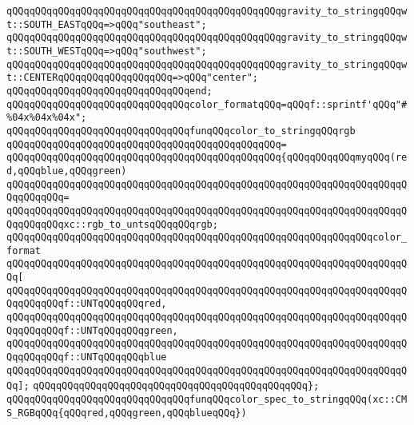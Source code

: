 \verb|qQQqqQQqqQQqqQQqqQQqqQQqqQQqqQQqqQQqqQQqqQQqqQQqgravity_to_stringqQQqwt::SOUTH_EASTqQQq=>qQQq"southeast";|\newline
\verb|qQQqqQQqqQQqqQQqqQQqqQQqqQQqqQQqqQQqqQQqqQQqqQQqgravity_to_stringqQQqwt::SOUTH_WESTqQQq=>qQQq"southwest";|\newline
\verb|qQQqqQQqqQQqqQQqqQQqqQQqqQQqqQQqqQQqqQQqqQQqqQQqgravity_to_stringqQQqwt::CENTERqQQqqQQqqQQqqQQqqQQq=>qQQq"center";|\newline
\verb|qQQqqQQqqQQqqQQqqQQqqQQqqQQqqQQqend;|\newline
\newline
\verb|qQQqqQQqqQQqqQQqqQQqqQQqqQQqqQQqcolor_formatqQQq=qQQqf::sprintf'qQQq"#%04x%04x%04x";|\newline
\newline
\verb|qQQqqQQqqQQqqQQqqQQqqQQqqQQqqQQqfunqQQqcolor_to_stringqQQqrgb|\newline
\verb|qQQqqQQqqQQqqQQqqQQqqQQqqQQqqQQqqQQqqQQqqQQqqQQq=|\newline
\verb|qQQqqQQqqQQqqQQqqQQqqQQqqQQqqQQqqQQqqQQqqQQqqQQq{qQQqqQQqqQQqmyqQQq(red,qQQqblue,qQQqgreen)|\newline
\verb|qQQqqQQqqQQqqQQqqQQqqQQqqQQqqQQqqQQqqQQqqQQqqQQqqQQqqQQqqQQqqQQqqQQqqQQqqQQqqQQq=|\newline
\verb|qQQqqQQqqQQqqQQqqQQqqQQqqQQqqQQqqQQqqQQqqQQqqQQqqQQqqQQqqQQqqQQqqQQqqQQqqQQqqQQqxc::rgb_to_untsqQQqqQQqrgb;|\newline
\newline
\verb|qQQqqQQqqQQqqQQqqQQqqQQqqQQqqQQqqQQqqQQqqQQqqQQqqQQqqQQqqQQqqQQqcolor_format|\newline
\verb|qQQqqQQqqQQqqQQqqQQqqQQqqQQqqQQqqQQqqQQqqQQqqQQqqQQqqQQqqQQqqQQqqQQqqQQq[|\newline
\verb|qQQqqQQqqQQqqQQqqQQqqQQqqQQqqQQqqQQqqQQqqQQqqQQqqQQqqQQqqQQqqQQqqQQqqQQqqQQqqQQqf::UNTqQQqqQQqred,|\newline
\verb|qQQqqQQqqQQqqQQqqQQqqQQqqQQqqQQqqQQqqQQqqQQqqQQqqQQqqQQqqQQqqQQqqQQqqQQqqQQqqQQqf::UNTqQQqqQQqgreen,|\newline
\verb|qQQqqQQqqQQqqQQqqQQqqQQqqQQqqQQqqQQqqQQqqQQqqQQqqQQqqQQqqQQqqQQqqQQqqQQqqQQqqQQqf::UNTqQQqqQQqblue|\newline
\verb|qQQqqQQqqQQqqQQqqQQqqQQqqQQqqQQqqQQqqQQqqQQqqQQqqQQqqQQqqQQqqQQqqQQqqQQq];|\newline
\verb|qQQqqQQqqQQqqQQqqQQqqQQqqQQqqQQqqQQqqQQqqQQqqQQq};|\newline
\newline
\verb|qQQqqQQqqQQqqQQqqQQqqQQqqQQqqQQqfunqQQqcolor_spec_to_stringqQQq(xc::CMS_RGBqQQq{qQQqred,qQQqgreen,qQQqblueqQQq})|\newline
